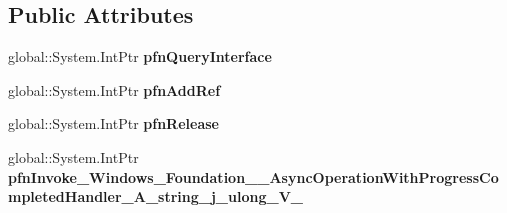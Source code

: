 \subsection*{Public Attributes}
\begin{DoxyCompactItemize}
\item 
\mbox{\label{struct_windows_1_1_foundation_1_1_async_operation_with_progress_completed_handler___a__string__j__ulong___v_______impl_1_1_vtbl_a4e390eaebcff9282f9759a3ed6a68962}} 
global\+::\+System.\+Int\+Ptr {\bfseries pfn\+Query\+Interface}
\item 
\mbox{\label{struct_windows_1_1_foundation_1_1_async_operation_with_progress_completed_handler___a__string__j__ulong___v_______impl_1_1_vtbl_ae2e1284d68f27f51f76b3e73557969fb}} 
global\+::\+System.\+Int\+Ptr {\bfseries pfn\+Add\+Ref}
\item 
\mbox{\label{struct_windows_1_1_foundation_1_1_async_operation_with_progress_completed_handler___a__string__j__ulong___v_______impl_1_1_vtbl_ac468360428e864fb42af4d89441e3f31}} 
global\+::\+System.\+Int\+Ptr {\bfseries pfn\+Release}
\item 
\mbox{\label{struct_windows_1_1_foundation_1_1_async_operation_with_progress_completed_handler___a__string__j__ulong___v_______impl_1_1_vtbl_a58850863d633b318c8b7b2031760c9cd}} 
global\+::\+System.\+Int\+Ptr {\bfseries pfn\+Invoke\+\_\+\+Windows\+\_\+\+Foundation\+\_\+\+\_\+\+Async\+Operation\+With\+Progress\+Completed\+Handler\+\_\+\+A\+\_\+string\+\_\+j\+\_\+ulong\+\_\+\+V\+\_\+}
\end{DoxyCompactItemize}
